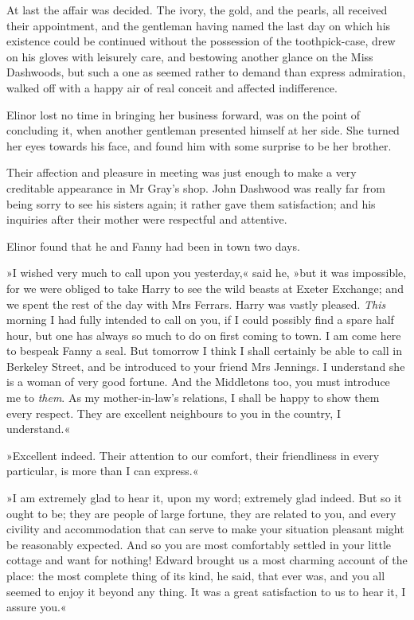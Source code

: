 At last the affair was decided. The ivory, the gold, and the pearls, all received their appointment, and the gentleman having named the last day on which his existence could be continued without the possession of the toothpick-case, drew on his gloves with leisurely care, and bestowing another glance on the Miss Dashwoods, but such a one as seemed rather to demand than express admiration, walked off with a happy air of real conceit and affected indifference.

Elinor lost no time in bringing her business forward, was on the point of concluding it, when another gentleman presented himself at her side. She turned her eyes towards his face, and found him with some surprise to be her brother.

Their affection and pleasure in meeting was just enough to make a very creditable appearance in Mr Gray’s shop. John Dashwood was really far from being sorry to see his sisters again; it rather gave them satisfaction; and his inquiries after their mother were respectful and attentive.

Elinor found that he and Fanny had been in town two days.

»I wished very much to call upon you yesterday,« said he, »but it was impossible, for we were obliged to take Harry to see the wild beasts at Exeter Exchange; and we spent the rest of the day with Mrs Ferrars. Harry was vastly pleased. \textit{This} morning I had fully intended to call on you, if I could possibly find a spare half hour, but one has always so much to do on first coming to town. I am come here to bespeak Fanny a seal. But tomorrow I think I shall certainly be able to call in Berkeley Street, and be introduced to your friend Mrs Jennings. I understand she is a woman of very good fortune. And the Middletons too, you must introduce me to \textit{them}. As my mother-in-law’s relations, I shall be happy to show them every respect. They are excellent neighbours to you in the country, I understand.«

»Excellent indeed. Their attention to our comfort, their friendliness in every particular, is more than I can express.«

»I am extremely glad to hear it, upon my word; extremely glad indeed. But so it ought to be; they are people of large fortune, they are related to you, and every civility and accommodation that can serve to make your situation pleasant might be reasonably expected. And so you are most comfortably settled in your little cottage and want for nothing! Edward brought us a most charming account of the place: the most complete thing of its kind, he said, that ever was, and you all seemed to enjoy it beyond any thing. It was a great satisfaction to us to hear it, I assure you.«

